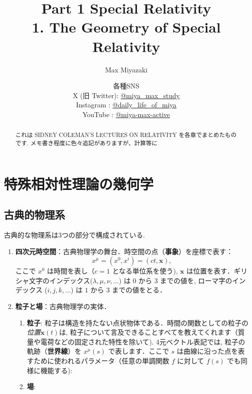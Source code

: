 \documentclass[12pt]{jsarticle}
\title{Part 1 Special Relativity\\
1. The Geometry of Special Relativity}
\date{各種SNS\\
    X (旧 Twitter): \href{https://x.com/miya_max_study}{@miya\_max\_study}\\
    Instagram : \href{https://www.instagram.com/daily_life_of_miya/}{@daily\_life\_of\_miya}\\
    YouTube : \href{https://www.youtube.com/@miya-max-active}{@miya-max-active}
    }
\author{Max Miyazaki}
\numberwithin{equation}{section}
\begin{document}
\maketitle
\vspace{1cm}
\begin{abstract}
    これは SIDNEY COLEMAN'S LECTURES ON RELATIVITY を各章でまとめたものです. メモ書き程度に色々追記がありますが、計算等に
\end{abstract}

\newpage
\tableofcontents
\newpage
\section{特殊相対性理論の幾何学}
\subsection{古典的物理系}
古典的な物理系は3つの部分で構成されている. 
\begin{enumerate}
    \item \textbf{四次元時空間}：古典物理学の舞台．時空間の点（\textbf{事象}）を座標で表す：
    \begin{equation*}
    x^{\mu} = (x^0, x^i) = (ct, \mathbf{x}), \tag{1.1}
    \end{equation*}
    ここで $x^0$ は時間を表し（$c = 1$ となる単位系を使う), $\mathbf{x}$ は位置を表す．ギリシャ文字のインデックス($\lambda, \mu, \nu, \ldots$) は $0$ から $3$ までの値を, ローマ字のインデックス ($i, j, k, \ldots$) は $1$ から $3$ までの値をとる．
    
    \item \textbf{粒子と場}：古典物理学の実体．
    
    \begin{enumerate}
    \item \textbf{粒子}: 粒子は構造を持たない点状物体である．時間の関数としての粒子の\textit{位置}$\mathbf{x}(t)$は, 粒子について言及できることすべてを教えてくれます（質量や電荷などの固定された特性を除いて). 4元ベクトル表記では, 粒子の軌跡（\textbf{世界線}）を $x^{\mu}(s)$ で表します．ここで $s$ は曲線に沿った点を表すために使われるパラメータ（任意の単調関数 $f$ に対して $f(s)$ でも同様に機能する):
    \item \textbf{場}:
    \end{enumerate}
    \end{enumerate}
\end{document}
